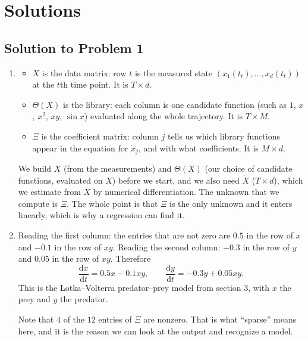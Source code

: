 \documentclass[a4paper,12pt]{article}
\begin{document}
\newpage

\section*{Solutions}

\subsection*{Solution to Problem 1}

\begin{enumerate}[label=(\alph*)]
\item
\begin{itemize}
\item $X$ is the data matrix: row $t$ is the measured state $\left( x_1(t_t), \ldots, x_d(t_t) \right)$ at the $t$th time point. It is $T \times d$.
\item $\Theta(X)$ is the library: each column is one candidate function (such as $1$, $x$, $x^2$, $xy$, $\sin x$) evaluated along the whole trajectory. It is $T \times M$.
\item $\Xi$ is the coefficient matrix: column $j$ tells us which library functions appear in the equation for $\dot{x}_j$, and with what coefficients. It is $M \times d$.
\end{itemize}
We build $X$ (from the measurements) and $\Theta(X)$ (our choice of candidate functions, evaluated on $X$) before we start, and we also need $\dot{X}$ ($T \times d$), which we estimate from $X$ by numerical differentiation. The unknown that we compute is $\Xi$. The whole point is that $\Xi$ is the only unknown and it enters linearly, which is why a regression can find it.

\item Reading the first column: the entries that are not zero are $0.5$ in the row of $x$ and $-0.1$ in the row of $xy$. Reading the second column: $-0.3$ in the row of $y$ and $0.05$ in the row of $xy$. Therefore
\[
\frac{\text{d}x}{\text{d}t} = 0.5 x - 0.1 xy,
\qquad
\frac{\text{d}y}{\text{d}t} = -0.3 y + 0.05 xy .
\]
This is the Lotka--Volterra predator--prey model from section 3, with $x$ the prey and $y$ the predator.

Note that $4$ of the $12$ entries of $\Xi$ are nonzero. That is what ``sparse'' means here, and it is the reason we can look at the output and recognize a model.


\end{enumerate}
\end{document}
